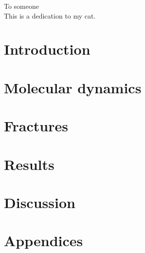 \documentclass[twoside,english,a4paper]{uiofysmaster}
\begin{document}

\cleardoublepage

\begin{abstract}
\lipsum
\end{abstract}

\begin{dedication}
  To someone
  \\\vspace{12pt}
  This is a dedication to my cat.
\end{dedication}

\begin{acknowledgements}
  \lipsum
\end{acknowledgements}

\tableofcontents

\listoffigures
\listoftables
\listoflistings

\part{Introduction}
    

\part{Molecular dynamics}
    
    
    

    
\part{Fractures}
    

\part{Results}
    

\part{Discussion}

\part{Appendices}
    
    
    

\printbibliography
\end{document}

